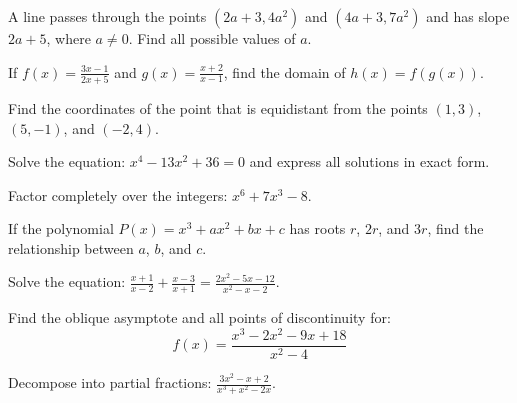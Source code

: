 \documentclass[12pt]{exam}
\begin{document}
\begin{questions}
\question[8]
A line passes through the points $(2a + 3, 4a^2)$ and $(4a + 3, 7a^2)$ and has slope $2a + 5$, where $a \neq 0$. Find all possible values of $a$.
\vspace*{6cm}

\question[7]
If $f(x) = \frac{3x-1}{2x+5}$ and $g(x) = \frac{x+2}{x-1}$, find the domain of $h(x) = f(g(x))$.
\vspace*{5cm}

\question[8]
Find the coordinates of the point that is equidistant from the points $(1, 3)$, $(5, -1)$, and $(-2, 4)$.
\vspace*{6cm}


\question[8]
Solve the equation: $x^4 - 13x^2 + 36 = 0$ and express all solutions in exact form.
\vspace*{5cm}

\question[10]
Factor completely over the integers: $x^6 + 7x^3 - 8$.
\vspace*{5cm}

\question[7]
If the polynomial $P(x) = x^3 + ax^2 + bx + c$ has roots $r$, $2r$, and $3r$, find the relationship between $a$, $b$, and $c$.
\vspace*{6cm}

\newpage


\question[10]
Solve the equation: $\frac{x+1}{x-2} + \frac{x-3}{x+1} = \frac{2x^2-5x-12}{x^2-x-2}$.
\vspace*{6cm}

\question[8]
Find the oblique asymptote and all points of discontinuity for:
\[ f(x) = \frac{x^3 - 2x^2 - 9x + 18}{x^2 - 4} \]
\vspace*{6cm}

\question[7]
Decompose into partial fractions: $\frac{3x^2-x+2}{x^3+x^2-2x}$.
\vspace*{6cm}



\end{questions}
\end{document}
